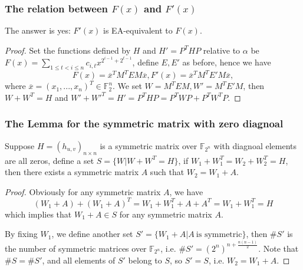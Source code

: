 \documentclass[
    aspectratio=169,                   %
]{beamer}
\newcommand{\F}{\mathbb{F}}
\begin{document}
    \begin{frame}
        \frametitle{The relation between $ F(x) $ and $ F'(x) $}
        The answer is yes: $F'(x)$ is EA-equivalent to $F(x)$.
        \begin{proof}
            
            Set the functions defined by $H$ and $H'=P^THP$ relative to $\alpha$ be $ F(x)=\sum_{1\le t<i\le n}c_{i,t}x^{2^{i-1}+2^{t-1}} $, define $ E,E' $ as before, hence we have 
            \[F(x) = \overline{x}^T M^T E M\overline{x},F'(x) = \overline{x}^T M^T E'M\overline{x},\]
            where $ \overline{x}=(x_1,...,x_n)^T\in\F_2^n $.
            We set $ W=M^TEM,W'=M^TE'M $, then $ W+W^T=H $ and $ W'+W'^T=H'=P^THP=P^TWP+P^TW^TP $.
        \end{proof}

    
    \end{frame}

    \begin{frame}
        \frametitle{The Lemma for the symmetric matrix with zero diagnoal}
        \begin{lemma}
            Suppose $ H=(h_{u,v})_{n\times n} $ is a symmetric matrix over $\F_{2^n}$ with diagnoal elements are
            all zeros,  define a set $ S=\{W|W+W^T=H\} $,  if $ W_1+W_1^T=W_2+W_2^T=H $, 
            then there exists a symmetric matrix $A$ such that $W_2 = W_1 + A$.
        \end{lemma}
        \begin{proof}
            Obviously for any symmetric matrix $A$, we have
            \[(W_1+A)+(W_1+A)^T=W_1+W_1^T+A+A^T=W_1+W_1^T=H\]
            which implies that $ W_1+A\in S $ for any symmetric matrix $A$.

            By fixing $ W_1 $, we define another set $ S'=\{W_1+A|A ~\text{is symmetric}\} $, then $ \#S' $ is the
            number of symmetric matrices over $ \F_{2^n} $, i.e. $ \#S'=(2^n)^{n+\frac{n(n-1)}{2}} $. Note that 
            $ \#S=\#S' $, and all elements of $ S' $ belong to $ S $, so $ S'=S $, i.e. $ W_2=W_1+A $.
        \end{proof}

    \end{frame}
    
\end{document}
